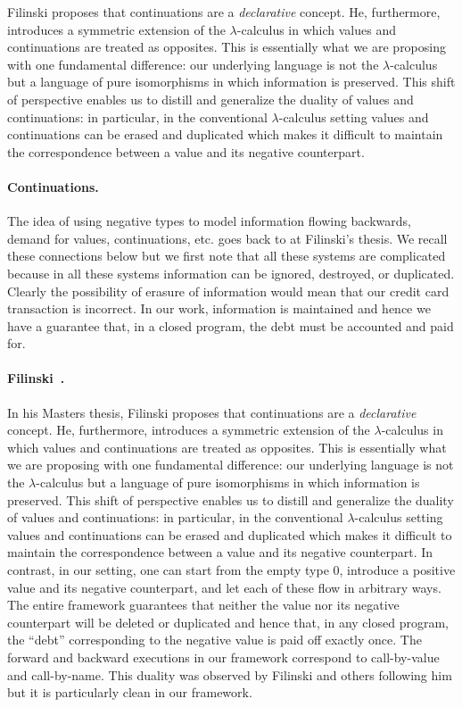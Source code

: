 \documentclass[preprint]{sigplanconf}
\begin{document}
Filinski proposes that continuations are a \emph{declarative} concept. He,
furthermore, introduces a symmetric extension of the $\lambda$-calculus in
which values and continuations are treated as opposites. This is essentially
what we are proposing with one fundamental difference: our underlying
language is not the $\lambda$-calculus but a language of pure isomorphisms in
which information is preserved. This shift of perspective enables us to
distill and generalize the duality of values and continuations: in
particular, in the conventional $\lambda$-calculus setting values and
continuations can be erased and duplicated which makes it difficult to
maintain the correspondence between a value and its negative counterpart. 

\paragraph*{Continuations.} The idea of using negative types to model
information flowing backwards, demand for values, continuations, etc. goes
back to at Filinski's thesis. We recall these connections below but we first
note that all these systems are complicated because in all these systems
information can be ignored, destroyed, or duplicated. Clearly the possibility
of erasure of information would mean that our credit card transaction is
incorrect. In our work, information is maintained and hence we have a
guarantee that, in a closed program, the debt must be accounted and paid for.

\paragraph*{Filinski~\cite{Filinski:1989:DCI:648332.755574}.}
In his Masters thesis, Filinski proposes that continuations are a
\emph{declarative} concept. He, furthermore, introduces a symmetric extension
of the $\lambda$-calculus in which values and continuations are treated as
opposites. This is essentially what we are proposing with one fundamental
difference: our underlying language is not the $\lambda$-calculus but a
language of pure isomorphisms in which information is preserved. This shift
of perspective enables us to distill and generalize the duality of values and
continuations: in particular, in the conventional $\lambda$-calculus setting
values and continuations can be erased and duplicated which makes it
difficult to maintain the correspondence between a value and its negative
counterpart. In contrast, in our setting, one can start from the empty type
$0$, introduce a positive value and its negative counterpart, and let each of
these flow in arbitrary ways. The entire framework guarantees that neither
the value nor its negative counterpart will be deleted or duplicated and
hence that, in any closed program, the ``debt'' corresponding to the negative
value is paid off exactly once. The forward and backward executions in our
framework correspond to call-by-value and call-by-name. This duality was
observed by Filinski and others following him but it is particularly clean in
our framework.
\end{document}
